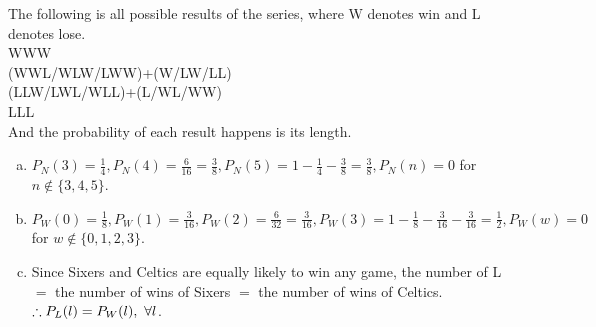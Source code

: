 \begin{pr}
The following is all possible results of the series, where W denotes win and L denotes lose.\\
WWW\\
(WWL/WLW/LWW)+(W/LW/LL)\\
(LLW/LWL/WLL)+(L/WL/WW)\\
LLL\\
And the probability of each result happens is its length.
\begin{enumerate}[(a)]
\item $P_N(3)=\frac14, P_N(4)=\frac6{16}=\frac38, P_N(5)=1-\frac14-\frac38=\frac38, P_N(n)=0$ for $n\notin\{3, 4, 5\}$.
\item $P_W(0)=\frac18, P_W(1)=\frac3{16}, P_W(2)=\frac6{32}=\frac3{16}, P_W(3)=1-\frac18-\frac3{16}-\frac3{16}=\frac12, P_W(w)=0$ for $w\notin\{0, 1, 2, 3\}$.
\item Since Sixers and Celtics are equally likely to win any game, the number of L $=$ the number of wins of Sixers $=$ the number of wins of Celtics.\\
$\therefore P_L(l)=P_W(l),\ \forall l$.
\end{enumerate}
\end{pr}
